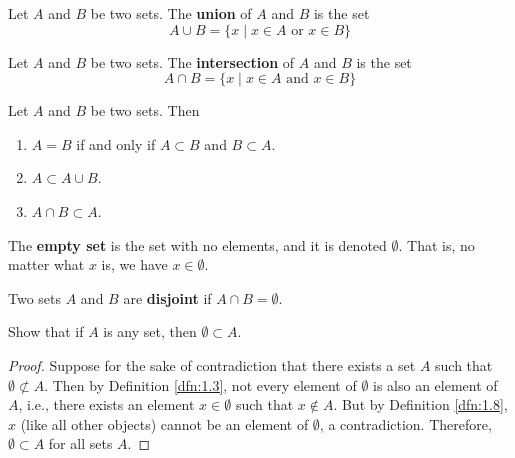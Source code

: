 \documentclass[../main.tex]{subfiles}
\begin{document}
\begin{definition}\label{dfn:1.5}
    Let $A$ and $B$ be two sets. The \textbf{union} of $A$ and $B$ is the set
    \begin{equation*}
        A\cup B = \{x\mid x\in A\text{ or }x\in B\}
    \end{equation*}
\end{definition}

\begin{definition}\label{dfn:1.6}
    Let $A$ and $B$ be two sets. The \textbf{intersection} of $A$ and $B$ is the set
    \begin{equation*}
        A\cap B = \{x\mid x\in A\text{ and }x\in B\}
    \end{equation*}
\end{definition}

\begin{theorem}\label{trm:1.7}
    Let $A$ and $B$ be two sets. Then
    \begin{enumerate}[label={\alph*\textup{)}},ref={\thetheorem\alph*}]
        \item \label{trm:1.7a}$A=B$ if and only if $A\subset B$ and $B\subset A$.
        \item \label{trm:1.7b}$A\subset A\cup B$.
        \item \label{trm:1.7c}$A\cap B\subset A$.
    \end{enumerate}
\end{theorem}

\begin{definition}\label{dfn:1.8}
    The \textbf{empty set} is the set with no elements, and it is denoted $\emptyset$. That is, no matter what $x$ is, we have $x\in\emptyset$.
\end{definition}

\begin{definition}\label{dfn:1.9}
    Two sets $A$ and $B$ are \textbf{disjoint} if $A\cap B=\emptyset$.
\end{definition}

\begin{exercise}\label{exr:1.10}
    Show that if $A$ is any set, then $\emptyset\subset A$.
    \begin{proof}
        Suppose for the sake of contradiction that there exists a set $A$ such that $\emptyset\not\subset A$. Then by Definition \ref{dfn:1.3}, not every element of $\emptyset$ is also an element of $A$, i.e., there exists an element $x\in\emptyset$ such that $x\notin A$. But by Definition \ref{dfn:1.8}, $x$ (like all other objects) cannot be an element of $\emptyset$, a contradiction. Therefore, $\emptyset\subset A$ for all sets $A$.
    \end{proof}
\end{exercise}
\end{document}
